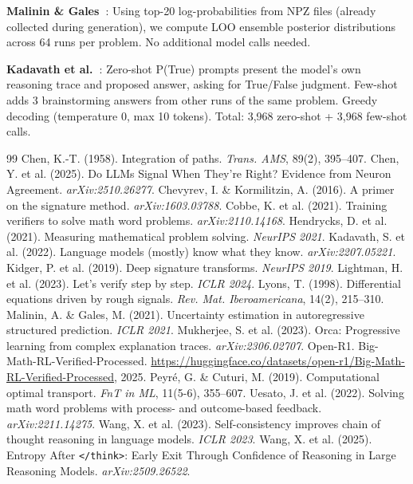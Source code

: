 \documentclass{article}
\begin{document}
\textbf{Malinin \& Gales~\cite{malinin2021uncertainty}}: Using top-20 log-probabilities from NPZ files (already collected during generation), we compute LOO ensemble posterior distributions across 64 runs per problem. No additional model calls needed.

\textbf{Kadavath et al.~\cite{kadavath2022language}}: Zero-shot P(True) prompts present the model's own reasoning trace and proposed answer, asking for True/False judgment. Few-shot adds 3 brainstorming answers from other runs of the same problem. Greedy decoding (temperature 0, max 10 tokens). Total: 3,968 zero-shot + 3,968 few-shot calls.


\begin{thebibliography}{99}
 Chen, K.-T. (1958). Integration of paths. \textit{Trans. AMS}, 89(2), 395--407.
 Chen, Y. et al. (2025). Do LLMs Signal When They're Right? Evidence from Neuron Agreement. \textit{arXiv:2510.26277}.
 Chevyrev, I. \& Kormilitzin, A. (2016). A primer on the signature method. \textit{arXiv:1603.03788}.
 Cobbe, K. et al. (2021). Training verifiers to solve math word problems. \textit{arXiv:2110.14168}.
 Hendrycks, D. et al. (2021). Measuring mathematical problem solving. \textit{NeurIPS 2021}.
 Kadavath, S. et al. (2022). Language models (mostly) know what they know. \textit{arXiv:2207.05221}.
 Kidger, P. et al. (2019). Deep signature transforms. \textit{NeurIPS 2019}.
 Lightman, H. et al. (2023). Let's verify step by step. \textit{ICLR 2024}.
 Lyons, T. (1998). Differential equations driven by rough signals. \textit{Rev. Mat. Iberoamericana}, 14(2), 215--310.
 Malinin, A. \& Gales, M. (2021). Uncertainty estimation in autoregressive structured prediction. \textit{ICLR 2021}.
 Mukherjee, S. et al. (2023). Orca: Progressive learning from complex explanation traces. \textit{arXiv:2306.02707}.
 Open-R1. Big-Math-RL-Verified-Processed. \url{https://huggingface.co/datasets/open-r1/Big-Math-RL-Verified-Processed}, 2025.
 Peyr{\'e}, G. \& Cuturi, M. (2019). Computational optimal transport. \textit{FnT in ML}, 11(5-6), 355--607.
 Uesato, J. et al. (2022). Solving math word problems with process- and outcome-based feedback. \textit{arXiv:2211.14275}.
 Wang, X. et al. (2023). Self-consistency improves chain of thought reasoning in language models. \textit{ICLR 2023}.
 Wang, X. et al. (2025). Entropy After \texttt{</think>}: Early Exit Through Confidence of Reasoning in Large Reasoning Models. \textit{arXiv:2509.26522}.
\end{thebibliography}
\end{document}

